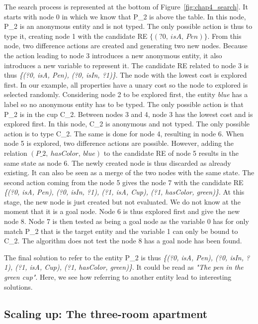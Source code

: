 The search process is represented at the bottom of Figure~\ref{fig:chap4_search}. It starts with node 0 in which we know that P\_2 is above the table. In this node, P\_2 is an anonymous entity and is not typed. The only possible action is thus to type it, creating node 1 with the candidate RE $\{(?0,\ isA,\ Pen)\}$. From this node, two difference actions are created and generating two new nodes. Because the action leading to node 3 introduces a new anonymous entity, it also introduces a new variable to represent it. The candidate RE related to node 3 is thus \textit{\{(?0, isA, Pen), (?0, isIn, ?1)\}}. The node with the lowest cost is explored first. In our example, all properties have a unary cost so the node to explored is selected randomly. Considering node 2 to be explored first, the entity \textit{blue} has a label so no anonymous entity has to be typed. The only possible action is that P\_2 is in the cup C\_2. Between nodes 3 and 4, node 3 has the lowest cost and is explored first. In this node, C\_2 is anonymous and not typed. The only possible action is to type C\_2. The same is done for node 4, resulting in node 6. When node 5 is explored, two difference actions are possible. However, adding the relation $(P\_2,\ hasColor,\ blue)$ to the candidate RE of node 5 results in the same state as node 6. The newly created node is thus discarded as already existing. It can also be seen as a merge of the two nodes with the same state. The second action coming from the node 5 gives the node 7 with the candidate RE \textit{\{(?0, isA, Pen), (?0, isIn, ?1), (?1, isA, Cup), (?1, hasColor, green)\}}. At this stage, the new node is just created but not evaluated. We do not know at the moment that it is a goal node. Node 6 is thus explored first and give the new node 8. Node 7 is then tested as being a goal node as the variable 0 has for only match P\_2 that is the target entity and the variable 1 can only be bound to C\_2. The algorithm does not test the node 8 has a goal node has been found.

The final solution to refer to the entity P\_2 is thus \textit{\{(?0, isA, Pen), (?0, isIn, ?1), (?1, isA, Cup), (?1, hasColor, green)\}}. It could be read as \textit{"The pen in the green cup"}. Here, we see how referring to another entity lead to interesting solutions.


\subsection{Scaling up: The three-room apartment}

